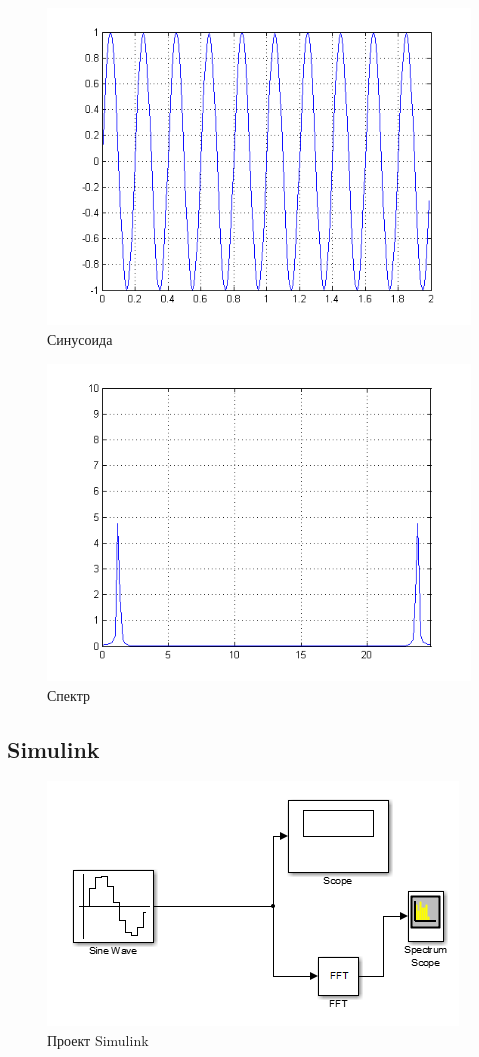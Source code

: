 \begin{figure}[H]
   \includegraphics[scale=0.7]{lab4/sin.png}
   \caption{Синусоида}
\end{figure}

\begin{figure}[H]
   \includegraphics[scale=0.7]{lab4/spectre.png}
   \caption{Спектр}
\end{figure}

\subsection{Simulink}

\begin{figure}[H]
   \includegraphics[scale=0.7]{lab4/simulink.png}
   \caption{Проект Simulink}
\end{figure}

